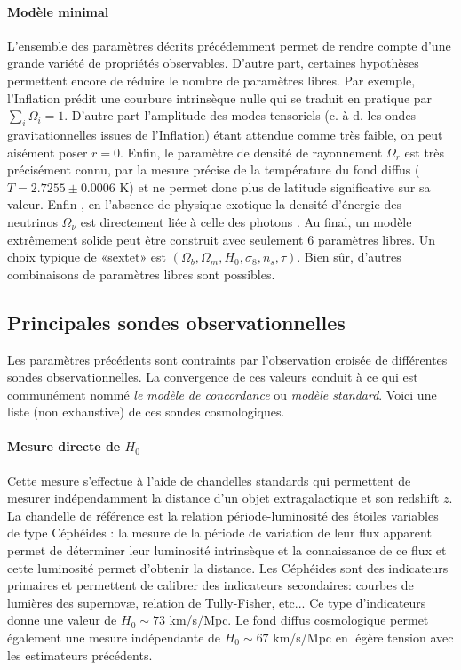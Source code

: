 \paragraph{Modèle minimal} L'ensemble des paramètres décrits précédemment permet de rendre compte d'une grande variété de propriétés observables. D'autre part, certaines hypothèses permettent encore de réduire le nombre de paramètres libres. Par exemple, l'Inflation prédit une courbure intrinsèque nulle qui se traduit en pratique par $\sum_i \Omega_i=1$. D'autre part l'amplitude des modes tensoriels (c.-à-d. les ondes gravitationnelles issues de l'Inflation) étant attendue comme très faible, on peut aisément poser $r=0$. Enfin, le paramètre de densité de rayonnement $\Omega_r$ est très précisément connu, par la mesure précise de la température  du fond diffus ($T=2.7255\pm0.0006$ K) et ne permet donc plus de latitude significative sur sa valeur. Enfin , en l'absence de physique exotique la densité d'énergie des neutrinos $\Omega_\nu$ est directement liée à celle des photons . Au final, un modèle extrêmement solide peut être construit avec seulement 6 paramètres libres. Un choix typique de «sextet» est $(\Omega_b,\Omega_m, H_0,\sigma_8,n_s,\tau)$. Bien sûr, d'autres combinaisons de paramètres libres sont possibles.

\subsection{Principales sondes observationnelles}

Les paramètres précédents sont contraints par l'observation croisée de différentes sondes observationnelles. La convergence de ces valeurs conduit à ce qui est communément nommé \textit{le modèle de concordance} ou \textit{modèle standard}. Voici une liste (non exhaustive) de ces sondes cosmologiques.

\paragraph{Mesure directe de $H_0$}
Cette mesure s'effectue à l'aide de chandelles standards qui permettent de mesurer indépendamment la distance d'un objet extragalactique et son redshift $z$. La chandelle de référence est la relation période-luminosité des étoiles variables de type Céphéides : la mesure de la période de variation de leur flux apparent permet de déterminer leur luminosité intrinsèque  et la connaissance de ce flux et cette luminosité permet d'obtenir la distance. Les Céphéides sont des indicateurs primaires et permettent de calibrer des indicateurs secondaires: courbes de lumières des supernovæ, relation de Tully-Fisher, etc... Ce type d'indicateurs donne une valeur de $H_0\sim 73$ km/s/Mpc. Le fond diffus cosmologique permet également une mesure indépendante de $H_0\sim 67$ km/s/Mpc en légère tension avec les estimateurs précédents.


